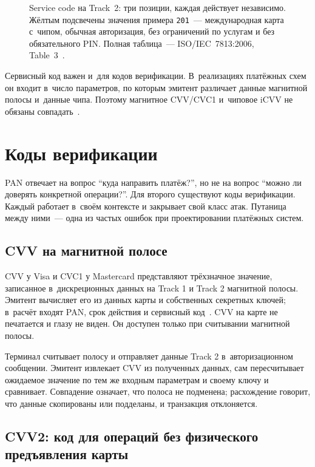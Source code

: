 \begin{figure}[tbp]
  \centering
  \caption{Service code на Track~2: три позиции, каждая действует независимо. Жёлтым подсвечены значения примера \texttt{201}~--- международная карта с~чипом, обычная авторизация, без ограничений по услугам и без обязательного PIN. Полная таблица~--- ISO/IEC~7813:2006, Table~3~\cite{iso-7813}.}\label{fig:service-code}
\end{figure}

Сервисный код важен и~для кодов верификации. В~реализациях платёжных схем
он входит в~число параметров, по которым эмитент различает данные
магнитной полосы и~данные чипа. Поэтому магнитное CVV/CVC1
и~чиповое iCVV не обязаны совпадать~\cite{visa-vsdc-guide,mc-security-rules-2016}.

\section{Коды верификации}\label{sec:card-data-cvv}

PAN отвечает на вопрос \enquote{куда направить платёж?}, но не
на вопрос \enquote{можно ли доверять конкретной операции?}. Для
второго существуют коды верификации. Каждый работает в~своём
контексте и закрывает свой класс атак. Путаница между ними~---
одна из частых ошибок при проектировании платёжных систем.

\subsection*{CVV на магнитной полосе}

CVV у Visa и CVC1 у Mastercard представляют трёхзначное значение,
записанное в~дискреционных данных на Track 1 и Track 2 магнитной
полосы. Эмитент вычисляет его из данных карты и собственных
секретных ключей; в~расчёт входят PAN, срок действия
и сервисный код~\cite{mc-security-rules-2016}. CVV на карте не
печатается и глазу не виден. Он доступен только при считывании
магнитной полосы.

Терминал считывает полосу и отправляет данные Track 2 в~авторизационном
сообщении. Эмитент извлекает CVV из полученных данных, сам пересчитывает
ожидаемое значение по тем же входным параметрам и своему ключу
и сравнивает. Совпадение означает, что полоса не подменена;
расхождение говорит, что данные скопированы или подделаны, и транзакция
отклоняется.

\subsection*{CVV2: код для операций без физического предъявления карты}

